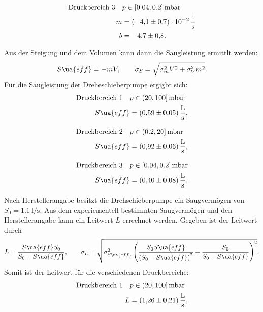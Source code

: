 \begin{align}
  \label{eq: regression_dreh_druck_3}
  \begin{aligned}
  \text{Druckbereich 3} \quad &p\in[0.04,0.2]\,\si{\milli\bar} \\
  m&=\SI{-4.1\pm0.7 e-2}{\per\second} \\
  b&=\num{-4.7 \pm0.8 }.
\end{aligned}
\end{align}

Aus der Steigung und dem Volumen kann dann die Saugleistung ermittlt werden:
\begin{equation}
  \label{eq: saug_druck}
  S\ua{eff}=-mV, \qquad \sigma_{S}=\sqrt{\sigma_{m}^{2} V^{2} + \sigma_{V}^{2} m^{2}}.
\end{equation}
Für die Saugleistung der Dreheschieberpumpe ergigbt sich:
\begin{align}
  \label{eq:dreh_saug_1}
  \begin{aligned}
  \text{Druckbereich 1} \quad  &p\in(20,100]\,\si{\milli\bar} \\
   S\ua{eff}&=\SI{0.59\pm 0.05}{\litre\per\second},
\end{aligned}
\end{align}

\begin{align}
  \label{eq:dreh_saug_2}
  \begin{aligned}
  \text{Druckbereich 2} \quad  &p\in(0.2,20]\,\si{\milli\bar} \\
   S\ua{eff}&=\SI{0.92\pm 0.06}{\litre\per\second},
\end{aligned}
\end{align}

\begin{align}
  \label{eq:dreh_saug_3}
  \begin{aligned}
  \text{Druckbereich 3} \quad &p\in[0.04,0.2]\,\si{\milli\bar} \\
   S\ua{eff}&=\SI{0.40\pm 0.08}{\litre\per\second}.
\end{aligned}
\end{align}

Nach Herstellerangabe besitzt die Drehschieberpumpe ein Saugvermögen von $S_0=\SI{1.1}{\litre\per\second}$.
Aus dem experiementell bestimmten Saugvermögen und den Herstellerangabe kann ein Leitwert $L$ errechnet werden.
Gegeben ist der Leitwert durch
\begin{equation}
  \label{eq: leitwert}
  L=\frac{S\ua{eff} S_0}{S_0-S\ua{eff}}, \qquad \sigma_L=\sqrt{ \sigma_{S\ua{eff}}^{2} \left(\frac{S_{0} S\ua{eff}}{\left(S_{0} - S\ua{eff}\right)^{2}} + \frac{S_{0}}{S_{0} - S\ua{eff}}\right)^{2}}.
\end{equation}
Somit ist der Leitwert für die verschiedenen Druckbereiche:
\begin{align}
  \label{eq:dreh_leit_1}
  \begin{aligned}
  \text{Druckbereich 1} \quad  &p\in(20,100]\,\si{\milli\bar} \\
   L&=\SI{1.26\pm 0.21}{\litre\per\second},
\end{aligned}
\end{align}

